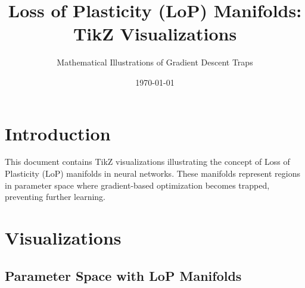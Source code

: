 \documentclass[11pt,a4paper]{article}
\title{Loss of Plasticity (LoP) Manifolds:\\TikZ Visualizations}
\author{Mathematical Illustrations of Gradient Descent Traps}
\date{\today}
\begin{document}
\maketitle

\section{Introduction}
This document contains TikZ visualizations illustrating the concept of Loss of Plasticity (LoP) manifolds in neural networks. These manifolds represent regions in parameter space where gradient-based optimization becomes trapped, preventing further learning.

\section{Visualizations}

\subsection{Parameter Space with LoP Manifolds}
\end{document}
